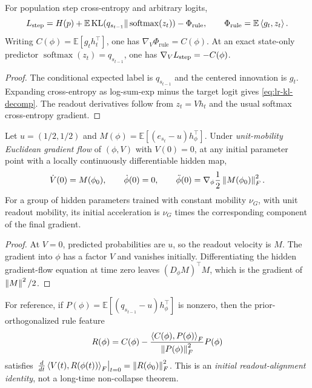 \begin{lrlemma}
\label{lem:lr-decomposition}
For population step cross-entropy and arbitrary logits,
\begin{equation}\label{eq:lr-kl-decomp}
 L_{\mathrm{step}}=H(p)+\mathbb E\operatorname{KL}
 (q_{s_{t-1}}\Vert\operatorname{softmax}(z_t))
 -\Phi_{\mathrm{rule}},\qquad
 \Phi_{\mathrm{rule}}=\mathbb E\left\langle g_t,z_t\right\rangle.
\end{equation}
Writing $C(\phi)=\mathbb E[g_t h_t^\top]$, one has
$\nabla_V\Phi_{\mathrm{rule}}=C(\phi)$.  At an exact state-only predictor
$\operatorname{softmax}(z_t)=q_{s_{t-1}}$, one has
$\nabla_VL_{\mathrm{step}}=-C(\phi)$.
\end{lrlemma}
\begin{proof}
The conditional expected label is $q_{s_{t-1}}$ and the centered
innovation is $g_t$.  Expanding cross-entropy as log-sum-exp minus the
target logit gives \eqref{eq:lr-kl-decomp}.  The readout derivatives follow
from $z_t=Vh_t$ and the usual softmax cross-entropy gradient.
\end{proof}

\begin{lrlemma}
\label{lem:lr-zero-bootstrap}
Let $u=(1/2,1/2)$ and
$M(\phi)=\mathbb E[(e_{s_t}-u)h_\phi^\top]$.
Under \emph{unit-mobility Euclidean gradient flow} of $(\phi,V)$ with
$V(0)=0$, at any initial parameter point with a locally continuously differentiable hidden map,
\begin{equation}\label{eq:lr-zero-boot}
 \dot V(0)=M(\phi_0),\qquad \dot\phi(0)=0,\qquad
 \ddot\phi(0)=\nabla_\phi\frac12\left\lVert M(\phi_0)\right\rVert_F^2.
\end{equation}
For a group of hidden parameters trained with constant mobility $\nu_G$,
with unit readout mobility, its initial acceleration is $\nu_G$ times the corresponding component of
the final gradient.
\end{lrlemma}
\begin{proof}
At $V=0$, predicted probabilities are $u$, so the readout velocity is
$M$.  The gradient into $\phi$ has a factor $V$ and vanishes initially.
Differentiating the hidden gradient-flow equation at time zero leaves
$(D_\phi M)^\top M$, which is the gradient of $\left\lVert M\right\rVert^2/2$.
\end{proof}

For reference, if $P(\phi)=\mathbb E[(q_{s_{t-1}}-u)h_\phi^\top]$ is nonzero,
then the prior-orthogonalized rule feature
\begin{equation}
 R(\phi)=C(\phi)-\frac{\left\langle C(\phi),P(\phi)\right\rangle_F}
 {\left\lVert P(\phi)\right\rVert_F^2}P(\phi)
\end{equation}
satisfies
$\left.\frac{d}{dt}\left\langle V(t),R(\phi(t))\right\rangle_F\right|_{t=0}
=\left\lVert R(\phi_0)\right\rVert_F^2$.
This is an \emph{initial readout-alignment identity}, not a long-time
non-collapse theorem.

